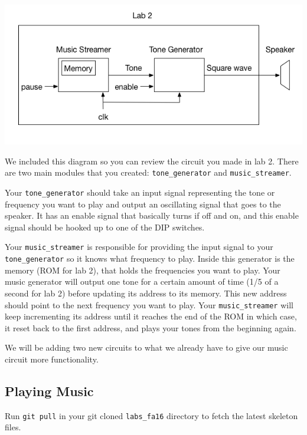 \documentclass[11pt]{article}
\begin{document}
\includegraphics[width=\textwidth]{images/lab2_fig1.png}

We included this diagram so you can review the circuit you made in lab 2. There are two main modules that you created: \verb|tone_generator| and \verb|music_streamer|. 

Your \verb|tone_generator| should take an input signal representing the tone or frequency you want to play and output an oscillating signal that goes to the speaker. It has an enable signal that basically turns if off and on, and this enable signal should be hooked up to one of the DIP switches.  

Your \verb|music_streamer| is responsible for providing the input signal to your \verb|tone_generator| so it knows what frequency to play. Inside this generator is the memory (ROM for lab 2), that holds the frequencies you want to play. Your music generator will output one tone for a certain amount of time (1/5 of a second for lab 2) before updating its address to its memory. This new address should point to the next frequency you want to play. Your \verb|music_streamer| will keep incrementing its address until it reaches the end of the ROM in which case, it reset back to the first address, and plays your tones from the beginning again. 

We will be adding two new circuits to what we already have to give our music circuit more functionality.

\subsection{Playing Music}
Run \verb|git pull| in your git cloned \verb|labs_fa16| directory to fetch the latest skeleton files.
\end{document}
